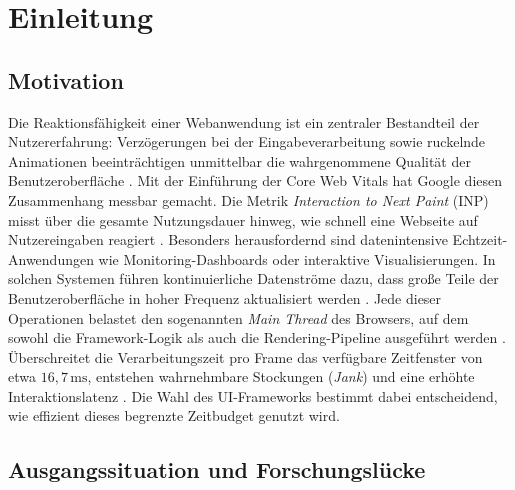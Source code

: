 \chapter{Einleitung}
\label{ch:einleitung}

\section{Motivation}
\label{s:motivation}

Die Reaktionsfähigkeit einer Webanwendung ist ein zentraler Bestandteil der Nutzererfahrung: Verzögerungen bei der Eingabeverarbeitung sowie ruckelnde Animationen beeinträchtigen unmittelbar die wahrgenommene Qualität der Benutzeroberfläche \cite{mdn-perceived-performance-2026}. Mit der Einführung der Core Web Vitals hat Google diesen Zusammenhang messbar gemacht. Die Metrik \textit{Interaction to Next Paint} (INP) misst über die gesamte Nutzungsdauer hinweg, wie schnell eine Webseite auf Nutzereingaben reagiert \cite{web.dev_inp_2025}. Besonders herausfordernd sind datenintensive Echtzeit-Anwendungen wie Monitoring-Dashboards oder interaktive Visualisierungen. In solchen Systemen führen kontinuierliche Datenströme dazu, dass große Teile der Benutzeroberfläche in hoher Frequenz aktualisiert werden \cite{furrer-livedashboard-2018}. Jede dieser Operationen belastet den sogenannten \textit{Main Thread} des Browsers, auf dem sowohl die Framework-Logik als auch die Rendering-Pipeline ausgeführt werden \cite{mdn_mthread_2025}. Überschreitet die Verarbeitungszeit pro Frame das verfügbare Zeitfenster von etwa $16{,}7\,\text{ms}$, entstehen wahrnehmbare Stockungen (\textit{Jank}) und eine erhöhte Interaktionslatenz \cite{web.dev_rendering_2023}. Die Wahl des UI-Frameworks bestimmt dabei entscheidend, wie effizient dieses begrenzte Zeitbudget genutzt wird.

\section{Ausgangssituation und Forschungslücke}
\label{s:ausgangssituation}

